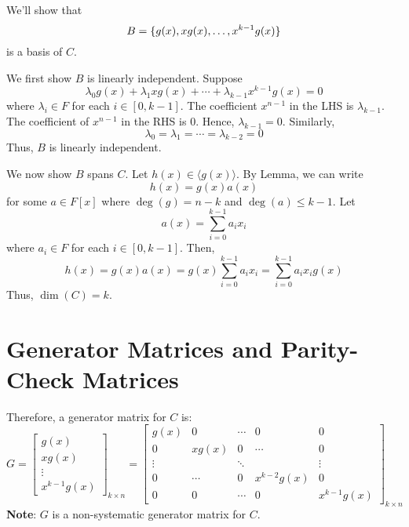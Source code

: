 \begin{Proof}{}{}
    We'll show that
    \[ B=\{g(x),xg(x),\ldots ,x^{k-1}g(x)\} \]
    is a basis of $ C $.

    We first show $ B $ is linearly independent. Suppose
    \[ \lambda_0g(x)+\lambda_1xg(x)+\cdots+\lambda_{k-1}x^{k-1}g(x)=0 \]
    where $ \lambda_i\in F $ for each $ i\in[0,k-1] $.
    The coefficient $ x^{n-1} $ in the LHS
    is $ \lambda_{k-1} $. The coefficient of $ x^{n-1} $ in the RHS is $ 0 $.
    Hence, $ \lambda_{k-1}=0 $. Similarly,
    \[ \lambda_0=\lambda_1=\cdots=\lambda_{k-2}=0 \]
    Thus, $ B $ is linearly independent.

    We now show $ B $ spans $ C $. Let $ h(x)\in \langle g(x)\rangle $.
    By Lemma, we can write
    \[ h(x)=g(x)a(x) \]
    for some $ a\in F[x] $ where $ \deg(g)=n-k $ and $ \deg(a)\leqslant k-1 $. Let
    \[ a(x)=\sum\limits_{i=0}^{k-1} a_i x_i \]
    where $ a_i\in F $ for each $ i\in[0,k-1] $. Then,
    \[ h(x)=g(x)a(x)=g(x)\sum\limits_{i=0}^{k-1} a_i x_i=
        \sum\limits_{i=0}^{k-1} a_i x_i g(x) \]
    Thus, $ \dim(C)=k $.
\end{Proof}

\section{Generator Matrices and Parity-Check Matrices}

Therefore, a generator matrix for $ C $ is:
\[ G
    =
    \begin{bmatrix}
        g(x)   \\
        xg(x)  \\
        \vdots \\
        x^{k-1}g(x)
    \end{bmatrix}_{k\times n}
    =
    \begin{bmatrix}
        g(x)   & 0      & \cdots & 0           & 0           \\
        0      & xg(x)  & 0      & \cdots      & 0           \\
        \vdots &        & \ddots &             & \vdots      \\
        0      & \cdots & 0      & x^{k-2}g(x) & 0           \\
        0      & 0      & \cdots & 0           & x^{k-1}g(x)
    \end{bmatrix}_{k\times n}
\]
\textbf{Note}: $ G $ is a non-systematic generator matrix for $ C $.


